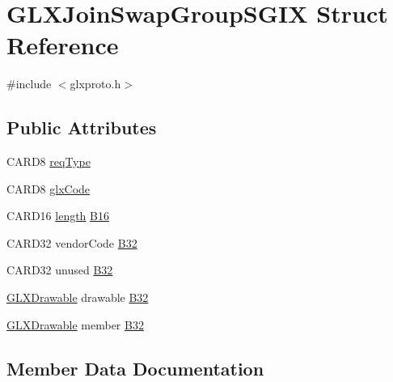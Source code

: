\hypertarget{struct_g_l_x_join_swap_group_s_g_i_x}{}\section{G\+L\+X\+Join\+Swap\+Group\+S\+G\+IX Struct Reference}
\label{struct_g_l_x_join_swap_group_s_g_i_x}


{\ttfamily \#include $<$glxproto.\+h$>$}

\subsection*{Public Attributes}
\begin{DoxyCompactItemize}
\item 
C\+A\+R\+D8 \hyperlink{struct_g_l_x_join_swap_group_s_g_i_x_a5754448ab337d3a8115cba1e74929843}{req\+Type}
\item 
C\+A\+R\+D8 \hyperlink{struct_g_l_x_join_swap_group_s_g_i_x_a6bc48310c3431c4626f83220b180ecea}{glx\+Code}
\item 
C\+A\+R\+D16 \hyperlink{glcorearb_8h_ab9c919755bde3b34349e23a32b4e0fa7}{length} \hyperlink{struct_g_l_x_join_swap_group_s_g_i_x_a63c31e9d9509eff51a63f328da07d3e2}{B16}
\item 
C\+A\+R\+D32 vendor\+Code \hyperlink{struct_g_l_x_join_swap_group_s_g_i_x_a4279241b4761206fe4459db529cd8f78}{B32}
\item 
C\+A\+R\+D32 unused \hyperlink{struct_g_l_x_join_swap_group_s_g_i_x_a80407e8ce0342095bc26e6f920394adb}{B32}
\item 
\hyperlink{glx_8h_a826f51745d9d6c81bdbac47ae2b80cf7}{G\+L\+X\+Drawable} drawable \hyperlink{struct_g_l_x_join_swap_group_s_g_i_x_a4a132ae9236ae6111723c0fe7bdea37d}{B32}
\item 
\hyperlink{glx_8h_a826f51745d9d6c81bdbac47ae2b80cf7}{G\+L\+X\+Drawable} member \hyperlink{struct_g_l_x_join_swap_group_s_g_i_x_a2767691000b8ca034a44fea6462dc88a}{B32}
\end{DoxyCompactItemize}


\subsection{Member Data Documentation}
\mbox{\label{struct_g_l_x_join_swap_group_s_g_i_x_a63c31e9d9509eff51a63f328da07d3e2}} 
